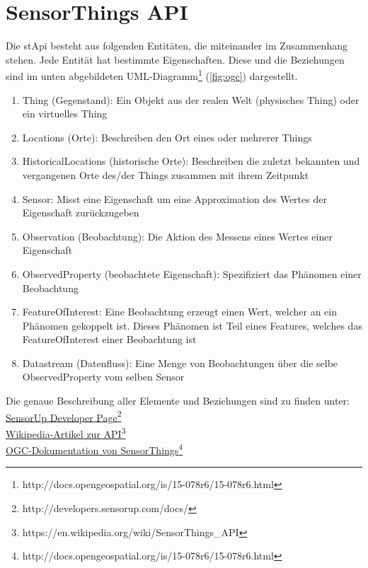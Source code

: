 \documentclass[a4paper, 12 pt]{article}
\begin{document}
\newpage
	\section{SensorThings API}

	Die \gls{stApi} besteht aus folgenden Entitäten, die miteinander im Zusammenhang stehen. Jede Entität hat bestimmte Eigenschaften. Diese und die Beziehungen sind im unten abgebildeten UML-Diagramm\footnote{http://docs.opengeospatial.org/is/15-078r6/15-078r6.html} (\cref{fig:ogc}) dargestellt. \\
	\begin{enumerate}
	
	\item Thing (Gegenstand): Ein Objekt aus der realen Welt (physisches Thing) oder ein virtuelles Thing
	\item Locations (Orte): Beschreiben den Ort eines oder mehrerer Things
	\item HistoricalLocations (historische Orte): Beschreiben die zuletzt bekannten und vergangenen Orte des/der Things zusammen mit ihrem Zeitpunkt
	\item Sensor: Misst eine Eigenschaft um eine Approximation des Wertes der Eigenschaft zurückzugeben
	\item Observation (Beobachtung): Die Aktion des Messens eines Wertes einer Eigenschaft
	\item ObservedProperty (beobachtete Eigenschaft): Spezifiziert das Phänomen einer Beobachtung
	\item FeatureOfInterest: Eine Beobachtung erzeugt einen Wert, welcher an ein Phänomen gekoppelt ist. Dieses Phänomen ist Teil eines Features, welches das FeatureOfInterest einer Beobachtung ist
	\item Datastream (Datenfluss): Eine Menge von Beobachtungen über die selbe ObservedProperty vom selben Sensor   
	\end{enumerate}
	Die genaue Beschreibung aller Elemente und Beziehungen sind zu finden unter: \\
	\href{http://developers.sensorup.com/docs/}{SensorUp Developer Page}\footnote{http://developers.sensorup.com/docs/}\\
	\href{https://en.wikipedia.org/wiki/SensorThings_API}{Wikipedia-Artikel zur API}\footnote{https://en.wikipedia.org/wiki/SensorThings\_API}\\
	\href{http://docs.opengeospatial.org/is/15-078r6/15-078r6.html}{OGC-Dokumentation von SensorThings}\footnote{http://docs.opengeospatial.org/is/15-078r6/15-078r6.html}\\
\end{document}
